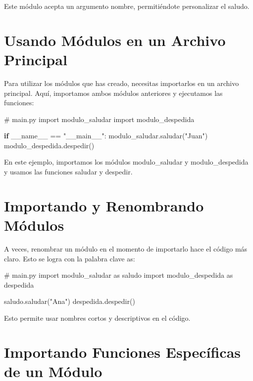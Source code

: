 \documentclass[
  a4paper,
  DIV=11,
  numbers=noendperiod,
  onepage,
  openany]{scrreprt}
\newenvironment{Shaded}{\begin{snugshade}}{\end{snugshade}}
\newcommand{\CommentTok}[1]{\textcolor[rgb]{0.37,0.37,0.37}{#1}}
\newcommand{\ControlFlowTok}[1]{\textcolor[rgb]{0.00,0.23,0.31}{\textbf{#1}}}
\newcommand{\ImportTok}[1]{\textcolor[rgb]{0.00,0.46,0.62}{#1}}
\newcommand{\NormalTok}[1]{\textcolor[rgb]{0.00,0.23,0.31}{#1}}
\newcommand{\OperatorTok}[1]{\textcolor[rgb]{0.37,0.37,0.37}{#1}}
\newcommand{\StringTok}[1]{\textcolor[rgb]{0.13,0.47,0.30}{#1}}
\newcommand{\VariableTok}[1]{\textcolor[rgb]{0.07,0.07,0.07}{#1}}
\begin{document}
Este módulo acepta un argumento nombre, permitiéndote personalizar el
saludo.

\section{Usando Módulos en un Archivo
Principal}\label{usando-muxf3dulos-en-un-archivo-principal}

Para utilizar los módulos que has creado, necesitas importarlos en un
archivo principal. Aquí, importamos ambos módulos anteriores y
ejecutamos las funciones:

\begin{Shaded}
\begin{Highlighting}[]
\CommentTok{\# main.py}
\ImportTok{import}\NormalTok{ modulo\_saludar}
\ImportTok{import}\NormalTok{ modulo\_despedida}

\ControlFlowTok{if} \VariableTok{\_\_name\_\_} \OperatorTok{==} \StringTok{"\_\_main\_\_"}\NormalTok{:}
\NormalTok{    modulo\_saludar.saludar(}\StringTok{"Juan"}\NormalTok{)}
\NormalTok{    modulo\_despedida.despedir()}
\end{Highlighting}
\end{Shaded}

En este ejemplo, importamos los módulos modulo\_saludar y
modulo\_despedida y usamos las funciones saludar y despedir.

\section{Importando y Renombrando
Módulos}\label{importando-y-renombrando-muxf3dulos}

A veces, renombrar un módulo en el momento de importarlo hace el código
más claro. Esto se logra con la palabra clave as:

\begin{Shaded}
\begin{Highlighting}[]
\CommentTok{\# main.py}
\ImportTok{import}\NormalTok{ modulo\_saludar }\ImportTok{as}\NormalTok{ saludo}
\ImportTok{import}\NormalTok{ modulo\_despedida }\ImportTok{as}\NormalTok{ despedida}

\NormalTok{saludo.saludar(}\StringTok{"Ana"}\NormalTok{)}
\NormalTok{despedida.despedir()}
\end{Highlighting}
\end{Shaded}

Esto permite usar nombres cortos y descriptivos en el código.

\section{Importando Funciones Específicas de un
Módulo}\label{importando-funciones-especuxedficas-de-un-muxf3dulo}
\end{document}
